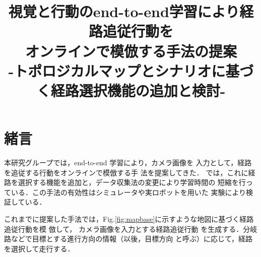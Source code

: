 \documentclass{sice-si}
\title{視覚と行動のend-to-end学習により経路追従行動を\\
オンラインで模倣する手法の提案\\
-トポロジカルマップとシナリオに基づく経路選択機能の追加と検討-\\} %
\begin{document}

\maketitle

\section{緒言}

本研究グループでは，end-to-end 学習により，カメラ画像を
入力として，経路を追従する行動をオンラインで模倣する手
法を提案してきた．\cite{okada2020}\cite{okada2021}\cite{kiyooka2021}
\cite{takahashi2023}\cite{imai2023}
\cite{haruyama2022}\cite{fujiwara2023}
では，これに経路を選択する機能を追加と，データ収集法の変更により学習時間の
短縮を行っている．この手法の有効性はシミュレータや実ロボットを用いた
実験により検証している．

\par
これまでに提案した手法では，Fig.\ref{fig:mapbase}に示すような地図に基づく経路追従行動を模
倣して，
カメラ画像を入力とする経路追従行動
を生成する．分岐路などで目標とする進行方向の情報（以後，目標方向
と呼ぶ）に応じて，経路を選択して走行する．\par
\end{document}
